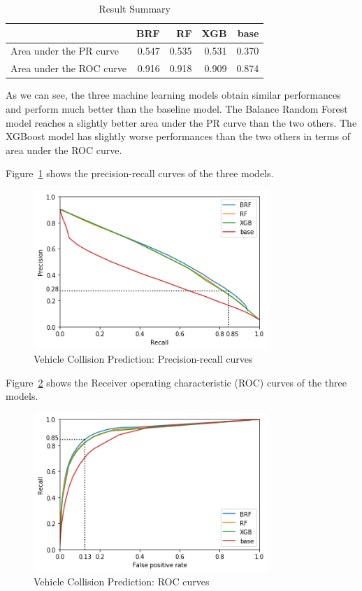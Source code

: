 \documentclass[conference]{IEEEtran}
\begin{document}
\begin{table}[htbp]
\caption{Result Summary}
\begin{center}
\begin{tabular}{|l|r|r|r|r|}
\cline{2-5}
\multicolumn{1}{c|}{}    &    BRF &    RF  &    XGB & base \\
\hline
Area under the PR curve  &  0.547 &  0.535 &  0.531 & 0.370 \\
Area under the ROC curve &  0.916 &  0.918 &  0.909 & 0.874 \\
\hline
\end{tabular}
\label{table:summary}
\end{center}
\end{table}
As we can see, the three machine learning models obtain similar performances
and perform much better than the baseline model. The Balance Random Forest model
reaches a slightly better area under the PR curve than the two others. The XGBoost
model has slightly worse performances than the two others in terms of area under
the ROC curve. 

Figure~\ref{fig:precision-recall} shows the precision-recall curves of the three models.

\begin{figure}[htbp]
\centerline{\includegraphics[height=6cm, keepaspectratio]{Figures/pr.png}}
\caption{Vehicle Collision Prediction: Precision-recall curves}
\label{fig:precision-recall}
\end{figure}

Figure~\ref{fig:roc} shows the Receiver operating characteristic (ROC) curves of the three models.

\begin{figure}[htbp]
\centerline{\includegraphics[height=6cm, keepaspectratio]{Figures/roc.png}}
\caption{Vehicle Collision Prediction: ROC curves}
\label{fig:roc}
\end{figure}
\end{document}
